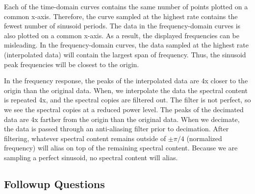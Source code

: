 \documentclass{article}
\begin{document}
Each of the time-domain curves contains the same number of points plotted on a common x-axis. Therefore, the curve sampled at the highest rate contains the fewest number of sinusoid periods. The data in the frequency-domain curves is also plotted on a common x-axis. As a result, the displayed frequencies can be misleading. In the frequency-domain curves, the data sampled at the highest rate (interpolated data) will contain the largest span of frequency. Thus, the sinusoid peak frequencies will be closest to the origin. 

In the frequency response, the peaks of the interpolated data are 4x closer to the origin than the original data. When, we interpolate the data the spectral content is repeated 4x, and the spectral copies are filtered out. The filter is not perfect, so we see the spectral copies at a reduced power level. The peaks of the decimated data are 4x farther from the origin than the original data. When we decimate, the data is passed through an anti-aliasing filter prior to decimation. After filtering, whatever spectral content remains outside of $\pm\pi/4$ (normalized frequency) will alias on top of the remaining spectral content. Because we are sampling a perfect sinusoid, no spectral content will alias.

\subsection{Followup Questions}
\end{document}
